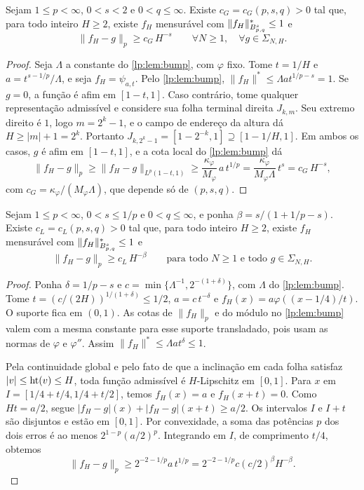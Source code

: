 \documentclass[12pt,a4paper]{article}
\begin{document}
\begin{proposicao}
\label{lp:prop:geom-floor}
Sejam $1\le p<\infty$, $0<s<2$ e $0<q\le\infty$. Existe $c_G=c_G(p,s,q)>0$ tal que, para todo inteiro $H\ge2$, existe $f_H$ mensurável com $\|f_H\|^*_{B^{s}_{p,q}}\le1$ e
\[
 \|f_H-g\|_p\ge c_G\,H^{-s}\qquad \forall N\ge1,\quad \forall g\in\Sigma_{N,H}.
\]
\end{proposicao}

\begin{proof}
Seja $\Lambda$ a constante do \cref{lp:lem:bump}, com $\varphi$ fixo. Tome $t=1/H$ e $a=t^{s-1/p}/\Lambda$, e seja $f_H=\psi_{a,t}$. Pelo \cref{lp:lem:bump}, $\|f_H\|^*\le\Lambda a t^{1/p-s}=1$. Se $g=0$, a função é afim em $[1-t,1]$. Caso contrário, tome qualquer representação admissível e considere sua folha terminal direita $J_{k,m}$. Seu extremo direito é $1$, logo $m=2^k-1$, e o campo de endereço da altura dá $H\ge |m|+1=2^k$. Portanto $J_{k,2^k-1}=[1-2^{-k},1]\supseteq[1-1/H,1]$. Em ambos os casos, $g$ é afim em $[1-t,1]$, e a cota local do \cref{lp:lem:bump} dá
\[
 \|f_H-g\|_p\ge\|f_H-g\|_{L^p(1-t,1)}\ge\frac{\kappa_\varphi}{M_\varphi}\,a\,t^{1/p}=\frac{\kappa_\varphi}{M_\varphi\Lambda}\,t^{s}=c_G\,H^{-s},
\]
com $c_G=\kappa_\varphi/(M_\varphi\Lambda)$, que depende só de $(p,s,q)$.
\end{proof}

\begin{proposicao}
\label{lp:prop:slope-floor}
Sejam $1\le p<\infty$, $0<s\le1/p$ e $0<q\le\infty$, e ponha $\beta=s/(1+1/p-s)$. Existe $c_L=c_L(p,s,q)>0$ tal que, para todo inteiro $H\ge2$, existe $f_H$ mensurável com $\|f_H\|^*_{B^{s}_{p,q}}\le1$ e
\[
 \|f_H-g\|_p\ge c_L\,H^{-\beta}\qquad\text{para todo }N\ge1\text{ e todo }g\in\Sigma_{N,H}.
\]
\end{proposicao}

\begin{proof}
Ponha $\delta=1/p-s$ e $c=\min\{\Lambda^{-1},2^{-(1+\delta)}\}$, com $\Lambda$ do \cref{lp:lem:bump}. Tome $t=(c/(2H))^{1/(1+\delta)}\le1/2$, $a=c\,t^{-\delta}$ e $f_H(x)=a\varphi((x-1/4)/t)$. O suporte fica em $(0,1)$. As cotas de $\|f_H\|_p$ e do módulo no \cref{lp:lem:bump} valem com a mesma constante para esse suporte transladado, pois usam as normas de $\varphi$ e $\varphi''$. Assim $\|f_H\|^*\le\Lambda a t^\delta\le1$.

Pela continuidade global e pelo fato de que a inclinação em cada folha satisfaz $|v|\le\operatorname{ht}(v)\le H$, toda função admissível é $H$-Lipschitz em $[0,1]$. Para $x$ em $I=[1/4+t/4,1/4+t/2]$, temos $f_H(x)=a$ e $f_H(x+t)=0$. Como $Ht=a/2$, segue $|f_H-g|(x)+|f_H-g|(x+t)\ge a/2$. Os intervalos $I$ e $I+t$ são disjuntos e estão em $[0,1]$. Por convexidade, a soma das potências $p$ dos dois erros é ao menos $2^{1-p}(a/2)^p$. Integrando em $I$, de comprimento $t/4$, obtemos
\[
 \|f_H-g\|_p\ge 2^{-2-1/p}a\,t^{1/p}
 =2^{-2-1/p}c(c/2)^\beta H^{-\beta}.
\]
\end{proof}
\end{document}
